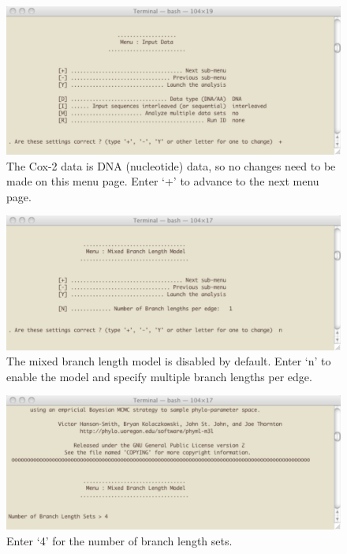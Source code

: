 \documentclass[11pt]{article}
\begin{document}
\begin{figure}[p]
\centering
\includegraphics[width=5.5 in]{GRAPHICS/a2.pdf}
\caption{The Cox-2 data is DNA (nucleotide) data, so no changes need to be made on this menu page.  Enter `+' to advance to the next menu page.}
\end{figure}
\clearpage

\begin{figure}[p]
\centering
\includegraphics[width=5.5 in]{GRAPHICS/a3.pdf}
\caption{The mixed branch length model is disabled by default.  Enter `n' to enable the model and specify multiple branch lengths per edge.}
\end{figure}
\clearpage

\begin{figure}[p]
\centering
\includegraphics[width=5.5 in]{GRAPHICS/a4.pdf}
\caption{Enter `4' for the number of branch length sets.}
\end{figure}
\clearpage
\end{document}
